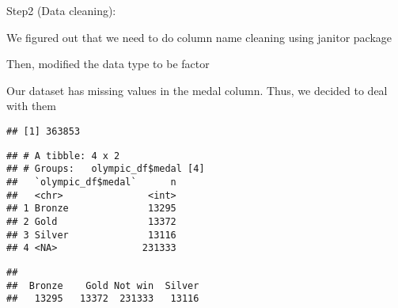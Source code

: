 \documentclass[
  ignorenonframetext,
]{beamer}
\begin{document}
\begin{frame}[fragile]{Step2 (Data cleaning):}
\protect\hypertarget{step2-data-cleaning}{}
\begin{block}{We figured out that we need to do column name cleaning
using janitor package}
\protect\hypertarget{we-figured-out-that-we-need-to-do-column-name-cleaning-using-janitor-package}{}
\end{block}

\begin{block}{Then, modified the data type to be factor}
\protect\hypertarget{then-modified-the-data-type-to-be-factor}{}
\end{block}

\begin{block}{Our dataset has missing values in the medal column. Thus,
we decided to deal with them}
\protect\hypertarget{our-dataset-has-missing-values-in-the-medal-column.-thus-we-decided-to-deal-with-them}{}
\begin{verbatim}
## [1] 363853
\end{verbatim}

\begin{verbatim}
## # A tibble: 4 x 2
## # Groups:   olympic_df$medal [4]
##   `olympic_df$medal`      n
##   <chr>               <int>
## 1 Bronze              13295
## 2 Gold                13372
## 3 Silver              13116
## 4 <NA>               231333
\end{verbatim}

\begin{verbatim}
## 
##  Bronze    Gold Not win  Silver 
##   13295   13372  231333   13116
\end{verbatim}
\end{block}
\end{frame}
\end{document}
